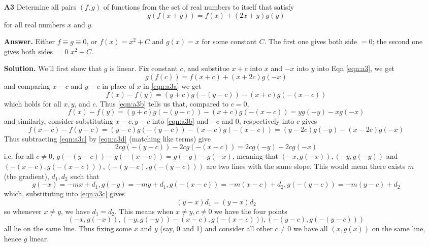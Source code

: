 \documentclass[11pt,a4paper]{article}
\begin{document}
\begin{enumerate}
	\item[\textbf{A3}]
	Determine all pairs $(f,g)$ of functions from the set of real numbers to itself that satisfy
	\begin{equation}\label{eqn:a3}
	  g(f(x+y)) = f(x) + (2x + y)g(y)
	\end{equation}
	for all real numbers $x$ and $y$.
	
	\textbf{Answer.} 
	Either $f\equiv g\equiv 0$, or $f(x)=x^2+C$ and $g(x)=x$ for some constant $C$. 
	The first one gives both side $=0$; 
	the second one gives both sides $=0$ $x^2+C$. 
	
	\textbf{Solution.} 
	We'll first show that $g$ is linear. 
	Fix constant $c$, and substitue $x+c$ into $x$ and $-x$ into $y$ into Eqn \ref{eqn:a3}, we get 
	\begin{equation}\label{eqn:a3a}
	  g(f(c)) = f(x+c) + (x+2c)g(-x)
	\end{equation}
	and comparing $x-c$ and $y-c$ in place of $x$ in \ref{eqn:a3a} we get 
	\begin{equation}\label{eqn:a3b}
	f(x) - f(y)= (y+c)g(-(y-c)) - (x+c)g(-(x-c)) 
	\end{equation}
	which holds for all $x, y$, and $c$. 
	Thus \ref{eqn:a3b} tells us that, compared to $c=0$, 
	\begin{equation}\label{eqn:a3c}
	f(x) - f(y)= (y+c)g(-(y-c)) - (x+c)g(-(x-c)) = yg(-y) - xg(-x) 
	\end{equation}
	and similarly, consider substituting $x-c, y-c$ into \ref{eqn:a3b}
	and $-c$ and 0, respectively into $c$ gives 
	\begin{equation}\label{eqn:a3d}
	f(x-c) - f(y-c) = (y-c)g(-(y-c)) - (x-c)g(-(x-c)) = (y-2c)g(-y) - (x-2c)g(-x) 
	\end{equation}
	Thus subtracting \ref{eqn:a3c} by \ref{eqn:a3d} (matching like terms) give 
	\begin{equation}\label{eqn:a3linear}
	  2cg(-(y-c)) - 2cg(-(x-c)) = 2cg(-y)-2cg(-x)
	\end{equation}
	i.e. for all $c\neq 0$, $g(-(y-c)) - g(-(x-c)) = g(-y)-g(-x)$, 
	meaning that $(-x, g(-x)), (-y, g(-y))$ and $(-(x-c), g(-(x-c))), (-(y-c), g(-(y-c)))$ 
	are two lines with the same slope. 
	This would mean there exists $m$ (the gradient), 
	$d_1, d_2$ such that 
	\[g(-x)=-mx+d_1, g(-y)=-my+d_1, 
	g(-(x-c))=-m(x-c)+d_2, g(-(y-c))=-m(y-c)+d_2
	\]
	which, substituting into \ref{eqn:a3c} gives 
	\[
	(y-x)d_1 = (y-x)d_2
	\]
	so whenever $x\neq y$, we have $d_1=d_2$. 
	This means when $x\neq y, c\neq 0$ we have the four points
	\[
	(-x, g(-x)), (-y, g(-y))-(x-c), g(-(x-c))), (-(y-c), g(-(y-c)))
	\]
	all lie on the same line. Thus fixing some $x$ and $y$ (say, 0 and 1) and consider all other $c\neq 0$ we have all $(x, g(x))$ on the same line, hence $g$ linear. 
	

\end{enumerate}
\end{document}
